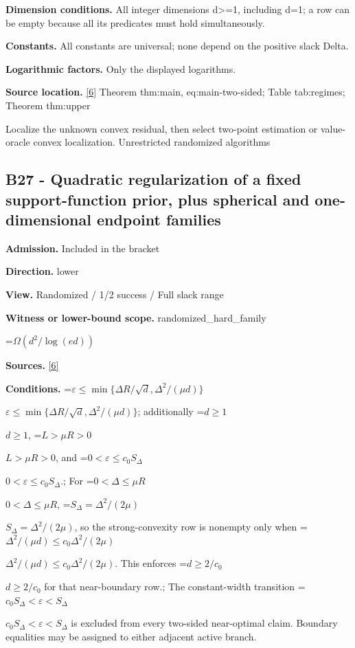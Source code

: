 \documentclass[10pt,a4paper]{article}
\newcommand{\AtlasMath}[1]{\par\begingroup\centering\setbox0=\hbox{$\displaystyle #1$}\ifdim\wd0>1.4\linewidth\typeout{ATLAS WIDE FORMULA: \the\wd0}\fi\ifdim\wd0>\linewidth\resizebox{\linewidth}{!}{\box0}\else\box0\fi\par\endgroup}
\newcommand{\AtlasInlineMath}[1]{\begingroup\setbox0=\hbox{$#1$}\ifdim\wd0>.4\linewidth\endgroup\AtlasMath{#1}\else\endgroup$#1$\fi}
\begin{document}
\textbf{Dimension conditions.} All integer dimensions d>=1, including d=1; a row can be empty because all its predicates must hold simultaneously.



\textbf{Constants.} All constants are universal; none depend on the positive slack Delta.



\textbf{Logarithmic factors.} Only the displayed logarithms.



\textbf{Source location.} \href{https://github.com/WU-Wendao/Colombo/blob/main/colombo_sensorium/Complexity_altas/data/sources/colombo/U10/manuscript.pdf}{[6]} Theorem thm:main, eq:main-two-sided; Table tab:regimes; Theorem thm:upper



Localize the unknown convex residual, then select two-point estimation or value-oracle convex localization. Unrestricted randomized algorithms



\subsection{B27 - Quadratic regularization of a fixed support-function prior, plus spherical and one-dimensional endpoint families}


\textbf{Admission.} Included in the bracket



\textbf{Direction.} lower



\textbf{View.} Randomized / 1/2 success / Full slack range



\textbf{Witness or lower-bound scope.} randomized\_hard\_family



\AtlasMath{\Omega(d^2/\log(ed))}


\textbf{Sources.} \href{https://github.com/WU-Wendao/Colombo/blob/main/colombo_sensorium/Complexity_altas/data/sources/colombo/U10/manuscript.pdf}{[6]}



\textbf{Conditions.} \AtlasInlineMath{\varepsilon\le\min\{\Delta R/\sqrt d,\Delta^2/(\mu d)\}}; additionally \AtlasInlineMath{d\ge1}, \AtlasInlineMath{L>\mu R>0}, and \AtlasInlineMath{0<\varepsilon\le c_0S_\Delta}.; For \AtlasInlineMath{0<\Delta\le\mu R}, \AtlasInlineMath{S_\Delta=\Delta^2/(2\mu)}, so the strong-convexity row is nonempty only when \AtlasInlineMath{\Delta^2/(\mu d)\le c_0\Delta^2/(2\mu)}. This enforces \AtlasInlineMath{d\ge2/c_0} for that near-boundary row.; The constant-width transition \AtlasInlineMath{c_0S_\Delta<\varepsilon<S_\Delta} is excluded from every two-sided near-optimal claim. Boundary equalities may be assigned to either adjacent active branch.
\end{document}

